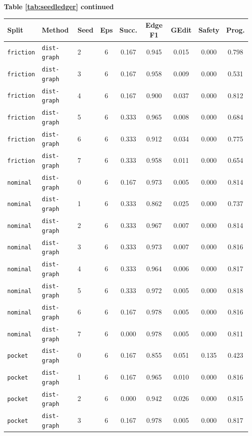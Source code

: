 \documentclass{article}
\begin{document}
\begin{center}
\textbf{Table \ref{tab:seedledger} continued}\\[0.4ex]
\begin{tabular}{lllcccccc}
\toprule
Split & Method & Seed & Eps & Succ. & Edge F1 & GEdit & Safety & Prog. \\
\midrule
\texttt{friction} & \texttt{dist-graph} & 2 & 6 & 0.167 & 0.945 & 0.015 & 0.000 & 0.798 \\
\texttt{friction} & \texttt{dist-graph} & 3 & 6 & 0.167 & 0.958 & 0.009 & 0.000 & 0.531 \\
\texttt{friction} & \texttt{dist-graph} & 4 & 6 & 0.167 & 0.900 & 0.037 & 0.000 & 0.812 \\
\texttt{friction} & \texttt{dist-graph} & 5 & 6 & 0.333 & 0.965 & 0.008 & 0.000 & 0.684 \\
\texttt{friction} & \texttt{dist-graph} & 6 & 6 & 0.333 & 0.912 & 0.034 & 0.000 & 0.775 \\
\texttt{friction} & \texttt{dist-graph} & 7 & 6 & 0.333 & 0.958 & 0.011 & 0.000 & 0.654 \\
\texttt{nominal} & \texttt{dist-graph} & 0 & 6 & 0.167 & 0.973 & 0.005 & 0.000 & 0.814 \\
\texttt{nominal} & \texttt{dist-graph} & 1 & 6 & 0.333 & 0.862 & 0.025 & 0.000 & 0.737 \\
\texttt{nominal} & \texttt{dist-graph} & 2 & 6 & 0.333 & 0.967 & 0.007 & 0.000 & 0.814 \\
\texttt{nominal} & \texttt{dist-graph} & 3 & 6 & 0.333 & 0.973 & 0.007 & 0.000 & 0.816 \\
\texttt{nominal} & \texttt{dist-graph} & 4 & 6 & 0.333 & 0.964 & 0.006 & 0.000 & 0.817 \\
\texttt{nominal} & \texttt{dist-graph} & 5 & 6 & 0.333 & 0.972 & 0.005 & 0.000 & 0.818 \\
\texttt{nominal} & \texttt{dist-graph} & 6 & 6 & 0.167 & 0.978 & 0.005 & 0.000 & 0.816 \\
\texttt{nominal} & \texttt{dist-graph} & 7 & 6 & 0.000 & 0.978 & 0.005 & 0.000 & 0.811 \\
\texttt{pocket} & \texttt{dist-graph} & 0 & 6 & 0.167 & 0.855 & 0.051 & 0.135 & 0.423 \\
\texttt{pocket} & \texttt{dist-graph} & 1 & 6 & 0.167 & 0.965 & 0.010 & 0.000 & 0.816 \\
\texttt{pocket} & \texttt{dist-graph} & 2 & 6 & 0.000 & 0.942 & 0.026 & 0.000 & 0.815 \\
\texttt{pocket} & \texttt{dist-graph} & 3 & 6 & 0.167 & 0.978 & 0.005 & 0.000 & 0.817 \\

\end{tabular}
\end{center}
\end{document}
